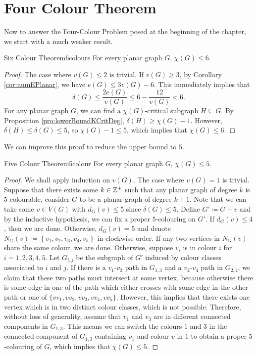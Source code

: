 \documentclass[math]{amznotes}
\theoremstyle{remark}
\newcommand{\0}{\mathbf{0}}
\newcommand{\1}{\mathbf{1}}
\begin{document}
\section{Four Colour Theorem}
Now to answer the Four-Colour Problem posed at the beginning of the chapter, we start with a much weaker result.
\begin{thmbox}{Six Colour Theorem}{6colours}
    For every planar graph $G$, $\chi(G) \leq 6$.
    \tcblower
    \begin{proof}
        The case where $v(G) \leq 2$ is trivial. If $v(G) \geq 3$, by Corollary \ref{cor:numEPlanar}, we have $e(G) \leq 3v(G) - 6$. This immediately implies that 
        \begin{equation*}
            \delta(G) \leq \frac{2e(G)}{v(G)} \leq 6 - \frac{12}{v(G)} < 6.
        \end{equation*}
        For any planar graph $G$, we can find a $\chi(G)$-critical subgraph $H \subseteq G$. By Proposition \ref{pro:lowerBoundKCritDeg}, $\delta(H) \geq \chi(G) - 1$. However, $\delta(H) \leq \delta(G) \leq 5$, so $\chi(G) - 1 \leq 5$, which implies that $\chi(G) \leq 6$.
    \end{proof}
\end{thmbox}
We can improve this proof to reduce the upper bound to $5$.
\begin{thmbox}{Five Colour Theorem}{5colour}
    For every planar graph $G$, $\chi(G) \leq 5$.
    \tcblower
    \begin{proof}
        We shall apply induction on $v(G)$. The case where $v(G) = 1$ is trivial. Suppose that there exists some $k \in \mathbb{Z}^+$ such that any planar graph of degree $k$ is $5$-colourable, consider $G$ to be a planar graph of degree $k + 1$. Note that we can take some $v \in V(G)$ with $d_G(v) \leq 5$ since $\delta(G) \leq 5$. Define $G' \coloneqq G - v$ and by the inductive hypothesis, we can fix a proper $5$-colouring on $G'$. If $d_G(v) \leq 4$, then we are done. Otherwise, $d_G(v) = 5$ and denote $N_G(v) \coloneqq \left\{v_1, v_2, v_3, v_4, v_5\right\}$ in clockwise order. If any two vertices in $N_G(v)$ share the same colour, we are done. Otherwise, suppose $v_i$ is in colour $i$ for $i = 1, 2, 3, 4, 5$. Let $G_{i, j}$ be the subgraph of $G'$ induced by colour classes associated to $i$ and $j$. If there is a $v_1$-$v_3$ path in $G_{1, 3}$ and a $v_2$-$v_4$ path in $G_{2, 4}$, we claim that these two paths must intersect at some vertex, because otherwise there is some edge in one of the path which either crosses with some edge in the other path or one of $\{vv_1, vv_2, vv_3, vv_4, vv_5\}$. However, this implies that there exists one vertex which is in two distinct colour classes, which is not possible. Therefore, without loss of generality, assume that $v_1$ and $v_3$ are in different connected components in $G_{1, 3}$. This means we can switch the colours $1$ and $3$ in the connected component of $G_{1, 3}$ containing $v_1$ and colour $v$ in $1$ to obtain a proper $5$-colouring of $G$, which implies that $\chi(G) \leq 5$.
    \end{proof}
\end{thmbox}
\end{document}
